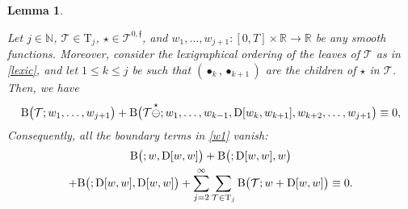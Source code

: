 \documentclass[%
11pt,  reqno]{amsart}
\makeatletter
\newcommand{\5}{\textup{V}}
\newtheorem{lemma}[theorem]{Lemma}
\theoremstyle{remark}
\newcommand{\R}{\mathbb{R}}
\newcommand{\bul}{\bullet}
\newcommand{\TT}{\mathcal{T}}
\newcommand{\Tr}{\mathrm{T}}
\newcommand{\ff}{\mathfrak{f}}
\newcommand{\N}{\mathbb{N}}
\def\<#1>{\csname MH@symb@#1\endcsname}
\newcommand{\B}{\mathcal{B}}
\numberwithin{equation}{section}
\numberwithin{theorem}{section}
\newcommand{\BB}{\mathrm{B}}
\newcommand{\D}{\mathrm{D}}
\makeatother
\begin{document}
\begin{lemma}
\label{LEM:wbd}




Let $j\in\N$, $\TT\in \Tr_j$, 
$\star \in \TT^{0,\ff}$, and $w_1, \ldots, w_{j+1}: [0,T]\times \R \to \R$ be any smooth functions. Moreover, consider the lexigraphical ordering of the leaves of $\TT$ as in \eqref{lexic}, 
and let $1 \le k \le j$ be such that $(\bul_k, \bul_{k+1})$ are the children of $\star$ in $\TT$. 
Then, we have 
\begin{align}
\label{wbd0}
\BB\big(\TT ; w_1, \ldots, w_{j+1} \big) 
+ \BB\big(\TT\overset{\star}{\ominus} \<1>; w_1,  \ldots, w_{k-1} , \D[w_k,w_{k+1}] , w_{k+2}, \ldots,  w_{j+1} \big) 
\equiv 0
,
\end{align}
Consequently, all the boundary terms in \eqref{w1} vanish:
\begin{multline}
\label{wbd1}
  \BB \big(\<1>; w, \D[w, w] \big) 
+ \BB\big(\<1>; \D[w, w],w\big) 
\\
+
\BB\big(\<1>;\D[w, w], \D[w, w]\big)
+ \sum_{j=2}^\infty \sum_{\TT\in \Tr_j}  \BB\big(\TT; w + \D[w, w]\big)  \equiv 0  .
\end{multline}


\end{lemma}
\end{document}
